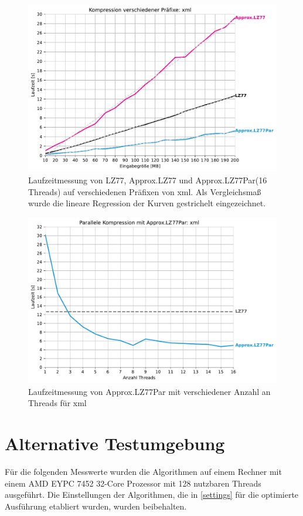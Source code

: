 \begin{figure}[H]
    \centering
    \caption{Laufzeitmessung von LZ77, Approx.LZ77 und Approx.LZ77Par(16 Threads) auf verschiedenen Präfixen von xml. Als Vergleichsmaß wurde 
    die lineare Regression der Kurven gestrichelt eingezeichnet.}
    \includegraphics[scale=0.68]{Images/progressive_xml.pdf}
\end{figure}

\begin{figure}[H]
    \centering
    \caption{Laufzeitmessung von Approx.LZ77Par mit verschiedener Anzahl an Threads für xml}
    \includegraphics[scale=0.68]{Images/progressive_speedup_xml.pdf}
\end{figure}
\pagebreak
\section{Alternative Testumgebung}
Für die folgenden Messwerte wurden die Algorithmen auf einem Rechner mit einem AMD EYPC 7452 32-Core Prozessor mit 128 nutzbaren Threads ausgeführt.
Die Einstellungen der Algorithmen, die in \ref{settings} für die optimierte Ausführung etabliert wurden, wurden beibehalten.

